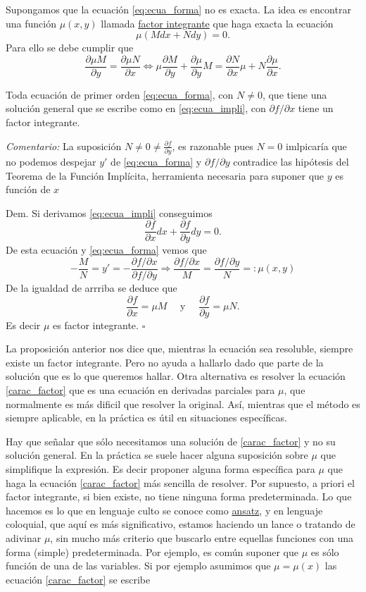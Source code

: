 \documentclass{article}
\newenvironment{demo}{\noindent\emph{Dem.}}{\qed}
\renewcommand{\emph}[1]{\textcolor[rgb]{1,0,0}{#1}}
\newcommand{\der}[2]{\frac{\partial #1}{\partial #2}}
\newcommand{\qed}{$\square$}
\newcounter{ejemplo_cont}
\begin{document}
 Supongamos que la ecuación  \eqref{eq:ecua_forma} no es  exacta. La idea es encontrar una función $\mu(x,y)$ llamada
\href{http://es.wikipedia.org/wiki/Ecuación_diferencial_exacta\#Factor_integrante.}{factor integrante} que haga exacta la ecuación
\[\mu\left(Mdx+Ndy\right)=0.\]
 Para ello se debe cumplir que
\begin{equation}\label{carac_factor}
  \der{\mu M}{y}=\der{\mu N}{x}\Longleftrightarrow \boxed{ \mu\der{M}{y}+\der{\mu}{y}M=\der{N}{x}\mu+N\der{\mu}{x}}.
\end{equation}

\begin{proposicion} Toda ecuación de primer orden \eqref{eq:ecua_forma}, con $N\neq 0$,  que tiene una solución general que se escribe como en \eqref{eq:ecua_impli}, con $\partial f/\partial x$  tiene un factor integrante.
\end{proposicion}
\noindent\textit{Comentario:} La suposición $N\neq 0 \neq\der{f}{y}$,  es razonable pues $N=0$ imlpicaría que no podemos despejar $y'$ de \eqref{eq:ecua_forma}  y $\partial f/\partial y$ contradice las hipótesis del Teorema de la Función Implícita, herramienta necesaria para suponer que $y$ es función de $x$

\begin{demo} Si derivamos \eqref{eq:ecua_impli} conseguimos
\[\der{f}{x}dx+\der{f}{y}dy=0.\]
De esta ecuación y \eqref{eq:ecua_forma}  vemos que
\[-\frac{M}{N}=y'=-\frac{\partial f /\partial x}{\partial f/\partial y}\Longrightarrow \frac{ \partial f /\partial x}{M}=\frac{ \partial f/\partial y}{N}=:\mu(x,y)\]
 De la igualdad de arrriba se deduce que
\[\der{f}{x}=\mu M\quad\text{ y }\quad \der{f}{y}=\mu N.\]
Es decir $\mu$ es factor integrante.
\end{demo}

La proposición anterior nos dice que, mientras la ecuación sea resoluble, siempre  existe un factor integrante. Pero no ayuda a hallarlo dado que parte de la solución que es lo que queremos hallar. Otra alternativa es resolver la ecuación \eqref{carac_factor} que es una ecuación en derivadas parciales para $\mu$, que normalmente es más dificil que resolver  la original. Así, mientras que el método es siempre aplicable, en la práctica es útil en situaciones específicas.

Hay que señalar que sólo necesitamos una solución de \eqref{carac_factor} y no su solución general. En la práctica se suele hacer alguna suposición
sobre $\mu$ que simplifique la expresión. Es decir proponer alguna forma específica para $\mu$ que haga la ecuación \eqref{carac_factor} más sencilla de resolver. Por supuesto, a priori el factor integrante, si bien existe, no tiene ninguna forma predeterminada. Lo que hacemos es lo que en lenguaje culto se conoce como \href{http://es.wikipedia.org/wiki/Ansatz}{ansatz}, y en lenguaje coloquial, que aquí es más significativo, estamos haciendo un lance o tratando de adivinar $\mu$, sin mucho más criterio que buscarlo entre equellas funciones con una forma (simple) predeterminada. Por ejemplo, es común suponer que $\mu$ es sólo función de una de las variables. Si por ejemplo asumimos que $\mu=\mu(x)$ las ecuación
\eqref{carac_factor} se escribe
\end{document}

